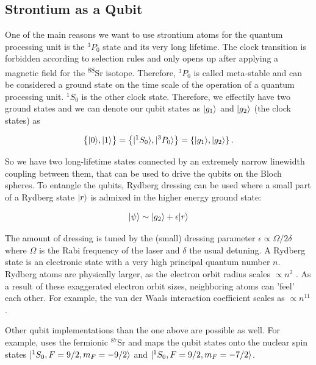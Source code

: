 \subsection{Strontium as a Qubit}\label{sec:QubitScheme}

One of the main reasons we want to use strontium atoms for the quantum processing unit is the ${}^3P_0$ state and its very long lifetime. The clock transition is forbidden according to selection rules and only opens up after applying a magnetic field for the \textsuperscript{88}Sr isotope. Therefore,  ${}^3P_0$ is called meta-stable and can be considered a ground state on the time scale of the operation of a quantum processing unit. ${}^1S_0$ is the other clock state. Therefore, we effectily have two ground states and we can denote our qubit states as $\lvert g_1\rangle$ and $\lvert g_2\rangle$ (the clock states) as

\begin{equation}\label{eq:QubitManifold}
	\big\{\lvert0\rangle,\lvert1\rangle\big\} = 
	\left\{
		\lvert{}^1S_0\rangle, \lvert{}^3P_0\rangle 
	\right\} = 
	\left\{ 
	    \lvert g_1\rangle, \lvert g_2\rangle
	\right\}.
\end{equation}

So we have two long-lifetime states connected by an extremely narrow linewidth coupling between them, that can be used to drive the qubits on the Bloch spheres. To entangle the qubits, Rydberg dressing can be used \cite{Wu2021} where a small part of a Rydberg state $\lvert r\rangle$ is admixed in the higher energy ground state:

\begin{equation}\label{eq:RydbergDressing}
	\lvert\psi\rangle \sim \lvert g_2\rangle + \epsilon \lvert r\rangle
\end{equation}

The amount of dressing is tuned by the (small) dressing parameter $\epsilon \propto \Omega / 2\delta$ where $\Omega$ is the Rabi frequency of the laser and $\delta$ the usual detuning. A Rydberg state is an electronic state with a very high principal quantum number $n$. Rydberg atoms are physically larger, as the electron orbit radius scales $\propto n^2$ \cite{Gallagher1994}. As a result of these exaggerated electron orbit sizes, neighboring atoms can 'feel' each other. For example, the van der Waals interaction coefficient scales as $\propto n^{11}$ \cite{Gallagher1994}. 

Other qubit implementations than the one above are possible as well. For example, \cite{Barnes2021} uses the fermionic ${}^{87}$Sr and maps the qubit states onto the nuclear spin states $\lvert{}^1S_0, F=9/2, m_F = -9/2\rangle$ and $\lvert{}^1S_0, F=9/2, m_F = -7/2\rangle$.

